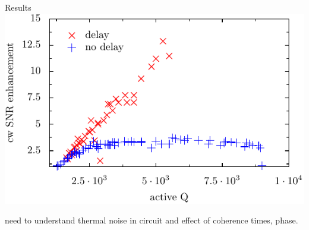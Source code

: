 \documentclass{beamer}
\begin{document}
%
%

\begin{frame}{Results}
\includegraphics[width=\textwidth]{experiment}

{\tiny need to understand thermal noise in circuit and effect of coherence times, phase.}
\end{frame}
\end{document}
